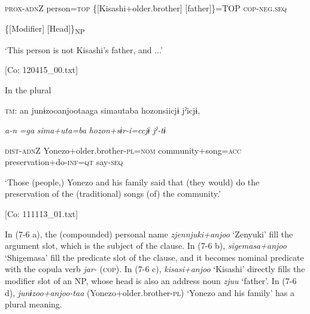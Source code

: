       \textsc{prox}-\textsc{adn}Z  person=\textsc{top}  \{[Kisashi+older.brother]  [father]\}=TOP         \textsc{cop}-\textsc{neg}.\textsc{seq}

          \{[Modifier]  [Head]\}\textsubscript{NP}

      ‘This person is not Kisashi’s father, and ...’

      [Co: 120415\_00.txt]

\ex \label{ex:7:6d}In the plural

    \textsc{tm}:  an  junɨzooanjootaaga  simautaba hozonsiicjɨ  jˀicjɨ,

      \textit{a-n}  \textit{=ga}  \textit{sima+uta=ba}  \textit{hozon+sɨr-i=ccjɨ}  \textit{jˀ-tɨ}
                                                                        
      \textsc{dist}-\textsc{adn}Z  Yonezo+older.brother-\textsc{pl}=\textsc{nom}  community+song=\textsc{acc}         preservation+do-\textsc{inf}=\textsc{qt}  say-\textsc{seq}

      ‘Those (people,) Yonezo and his family said that (they would) do the preservation of the (traditional) songs (of) the community.’

      [Co: 111113\_01.txt]
  \z
\z

In (7-6 a), the (compounded) personal name \textit{zjennjuki+anjoo} ‘Zenyuki’ fill the argument slot, which is the subject of the clause. In (7-6 b), \textit{sigemasa+anjoo} ‘Shigemasa’ fill the predicate slot of the clause, and it becomes nominal predicate with the copula verb \textit{jar-} (\textsc{cop}). In (7-6 c), \textit{kisasi+anjoo} ‘Kisashi’ directly fills the modifier slot of an NP, whose head is also an address noun \textit{zjuu} ‘father’. In (7-6 d), \textit{junɨzoo+anjoo-taa} (Yonezo+older.brother-\textsc{pl}) ‘Yonezo and his family’ has a plural meaning.

